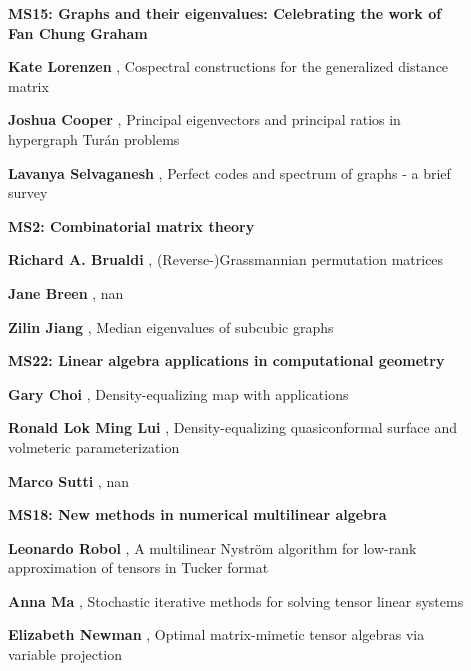 \documentclass[ILAS2025-program.tex]{subfiles}
\begin{document}
\begin{description}
\begin{description}
    \item[] {\color{mstitle}\textbf{MS15: Graphs and their eigenvalues: Celebrating the work of Fan Chung Graham}} 
    \item[] \textbf{Kate Lorenzen} , Cospectral constructions for the generalized distance matrix
        \item[] \textbf{Joshua Cooper} , Principal eigenvectors and principal ratios in hypergraph Tur\'{a}n problems
        \item[] \textbf{Lavanya Selvaganesh} , Perfect codes and spectrum of graphs - a brief survey

        \end{description}
    \begin{description}
    \item[] {\color{mstitle}\textbf{MS2: Combinatorial matrix theory}} 
    \item[] \textbf{Richard A. Brualdi} , (Reverse-)Grassmannian permutation matrices
        \item[] \textbf{Jane Breen} , nan
        \item[] \textbf{Zilin Jiang} , Median eigenvalues of subcubic graphs
        \end{description}
    \begin{description}
    \item[] {\color{mstitle}\textbf{MS22: Linear algebra applications in computational geometry}} 
    \item[] \textbf{Gary Choi} , Density-equalizing map with applications
        \item[] \textbf{Ronald Lok Ming Lui} , Density-equalizing quasiconformal surface and volmeteric parameterization
        \item[] \textbf{Marco Sutti} , nan
        \end{description}
    \begin{description}
    \item[] {\color{mstitle}\textbf{MS18: New methods in numerical multilinear algebra}} 
    \item[] \textbf{Leonardo Robol} , A multilinear Nyström algorithm for low-rank approximation of tensors in Tucker format
        \item[] \textbf{Anna Ma} , Stochastic iterative methods for solving tensor linear systems
        \item[] \textbf{Elizabeth Newman} , Optimal matrix-mimetic tensor algebras via variable projection


\end{description}
\end{description}
\end{document}
